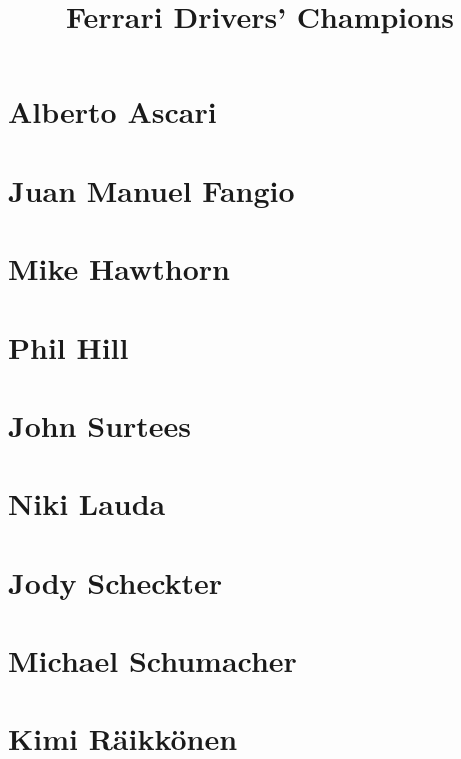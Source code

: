 \documentclass{beamer}
\title{Ferrari Drivers' Champions}
\begin{document}
\begin{frame}
\tableofcontents[pausesections]
\end{frame}

\section{Alberto Ascari}
\begin{frame}
\end{frame} 

\section{Juan Manuel Fangio}
\begin{frame}
\end{frame} 

\section{Mike Hawthorn}
\begin{frame}
\end{frame} 

\section{Phil Hill}
\begin{frame}
\end{frame} 

\section{John Surtees}
\begin{frame}
\end{frame} 

\section{Niki Lauda}
\begin{frame}
\end{frame} 

\section{Jody Scheckter}
\begin{frame}
\end{frame} 

\section{Michael Schumacher}
\begin{frame}
\end{frame} 

\section{Kimi Räikkönen}
\begin{frame}
\end{frame} 
\end{document}
